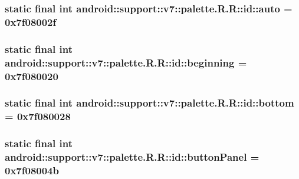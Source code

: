 \hypertarget{classandroid_1_1support_1_1v7_1_1palette_1_1_r_1_1id_588f1473f5b7cc1346c824d23277dbb0}{
\subsubsection[{auto}]{\setlength{\rightskip}{0pt plus 5cm}static final int android::support::v7::palette.R.R::id::auto = 0x7f08002f}}
\label{classandroid_1_1support_1_1v7_1_1palette_1_1_r_1_1id_588f1473f5b7cc1346c824d23277dbb0}


\hypertarget{classandroid_1_1support_1_1v7_1_1palette_1_1_r_1_1id_5ff1613b5bafa7f2583657e2e06eb682}{
\subsubsection[{beginning}]{\setlength{\rightskip}{0pt plus 5cm}static final int android::support::v7::palette.R.R::id::beginning = 0x7f080020}}
\label{classandroid_1_1support_1_1v7_1_1palette_1_1_r_1_1id_5ff1613b5bafa7f2583657e2e06eb682}


\hypertarget{classandroid_1_1support_1_1v7_1_1palette_1_1_r_1_1id_49607861def77a28fa34614204909c71}{
\subsubsection[{bottom}]{\setlength{\rightskip}{0pt plus 5cm}static final int android::support::v7::palette.R.R::id::bottom = 0x7f080028}}
\label{classandroid_1_1support_1_1v7_1_1palette_1_1_r_1_1id_49607861def77a28fa34614204909c71}


\hypertarget{classandroid_1_1support_1_1v7_1_1palette_1_1_r_1_1id_81db1a9fe3a6e839ef3f0ccffeadb93e}{
\subsubsection[{buttonPanel}]{\setlength{\rightskip}{0pt plus 5cm}static final int android::support::v7::palette.R.R::id::buttonPanel = 0x7f08004b}}
\label{classandroid_1_1support_1_1v7_1_1palette_1_1_r_1_1id_81db1a9fe3a6e839ef3f0ccffeadb93e}


